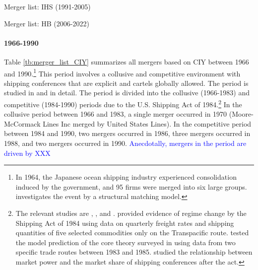 \documentclass[10pt]{article}
\begin{document}
\begin{table}[!htbp]
  \begin{center}
      \caption{Merger list: IHS (1991-2005)}
      \label{tb:merger_list_IHS} 
      
  \end{center}\footnotesize
\end{table} 

\begin{table}[!htbp]
  \begin{center}
      \caption{Merger list: HB (2006-2022)}
      \label{tb:merger_list_HB} 
      
  \end{center}\footnotesize
\end{table} 

\paragraph{1966-1990} 

Table \ref{tb:merger_list_CIY} summarizes all mergers based on CIY between 1966 and 1990.\footnote{In 1964, the Japanese ocean shipping industry experienced consolidation induced by the government, and 95 firms were merged into six large groups. \cite{otani2021estimating} investigates the event by a structural matching model.}
This period involves a collusive and competitive environment with shipping conferences that are explicit and cartels globally allowed. 
The period is studied in \cite{matsuda2022unified} and \cite{otani2023industry} in detail.
The period is divided into the collusive (1966-1983) and competitive (1984-1990) periods due to the U.S. Shipping Act of 1984.\footnote{The relevant studies are \cite{wilson1991some}, \cite{pirrong1992application}, and \cite{clyde1998market}. \cite{wilson1991some} provided evidence of regime change by the Shipping Act of 1984 using data on quarterly freight rates and shipping quantities of five selected commodities only on the Transpacific route. \cite{pirrong1992application} tested the model prediction of the core theory surveyed in \cite{sjostrom2013competition} using data from two specific trade routes between 1983 and 1985. \cite{clyde1998market} studied the relationship between market power and the market share of shipping conferences after the act. }
In the collusive period between 1966 and 1983, a single merger occurred in 1970 (Moore-McCormack Lines Inc merged by United States Lines). %
In the competitive period between 1984 and 1990, two mergers occurred in 1986, three mergers occurred in 1988, and two mergers occurred in 1990. 
\textcolor{blue}{Anecdotally, mergers in the period are driven by XXX}
\end{document}

